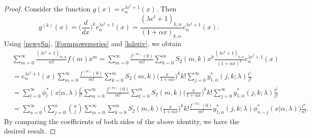 \documentclass{amsart}
\numberwithin{equation}{section}
\theoremstyle{definition}
\theoremstyle{remark}
\begin{document}
\begin{proof}
Consider the function $g(x)=e_{\alpha}^{\lambda e^t+1}(x)$. Then 
\begin{equation}\label{kderiv}
 g^{(k)}(x)=\Big(\frac{d}{dx}\Big)^ke_{\alpha}^{\lambda e^t+1}(x)=\frac{(\lambda e^t+1)_{k,\alpha}}{(1+\alpha x)_{k,\alpha}}e_{\alpha}^{\lambda e^t+1}(x).
\end{equation}
Using \eqref{newgSn}, \eqref{Formpowerseries} and  \eqref{kderiv}, we obtain
\begin{align}
\nonumber &\sum_{m=0}^{\infty}\frac{(\lambda e^t+1)_{m, \alpha}}{m!}f(m)x^m =\sum_{m=0}^{\infty}\frac{f^{(m)}(0)}{m!}\sum_{k=0}^{m}S_{2}(m,k)x^k\frac{(\lambda e^t+1)_{k,\alpha}}{(1+\alpha x)^k}e_{\alpha}^{\lambda e^t+1}(x)\\\nonumber
&=e_{\alpha}^{\lambda e^t+1}(x)\sum_{m=0}^{\infty}\frac{f^{(m)}(0)}{m!}\sum_{k=0}^{m}S_{2}(m,k)\Big(\frac{x}{1+\alpha x}\Big)^k k!\sum_{j=0}^{\infty}y_{1,\alpha}^{*}(j,k;\lambda)\frac{t^j}{j!}\\ \nonumber
&=\sum_{l=0}^{\infty}\phi^{*}_{l}(x|\alpha,\lambda)\frac{t^l}{l!}\sum_{m=0}^{\infty}\frac{f^{(m)}(0)}{m!}\sum_{k=0}^{m}S_{2}(m,k)\Big(\frac{x}{1+\alpha x}\Big)^k k!\sum_{j=0}^{\infty}y_{1,\alpha}^{*}(j,k;\lambda)\frac{t^j}{j!}\\ \nonumber
&=\sum_{n=0}^{\infty}\bigg(\sum_{j=0}^{n}\binom{n}{j}\sum_{m=0}^{\infty}\sum_{k=0}^{m}S_{2}(m,k)\Big(\frac{x}{1+\alpha x}\Big)^kk!\frac{f^{(m)}(0)}{m!}y_{1,\alpha}^{*}(j,k;\lambda)\phi^{*}_{n-j}(x|\alpha,\lambda)\bigg)\frac{t^n}{n!}.
\end{align}
By comparing the coefficients of both sides of the above identity, we have the desired result.
\end{proof}
\end{document}
